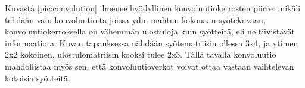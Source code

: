 \documentclass[finnish]{tktltiki2}
\theoremstyle{definition}
\theoremstyle{remark}
\begin{document}
    Kuvasta \ref{pic:convolution} ilmenee hyödyllinen konvoluutiokerrosten piirre: mikäli tehdään vain konvoluutioita joissa ydin mahtuu kokonaan syötekuvaan, konvoluutiokerroksella on vähemmän ulostuloja kuin syötteitä, eli ne tiivistävät informaatiota. Kuvan tapauksessa nähdään syötematriisin ollessa 3x4, ja ytimen 2x2 kokoinen, ulostulomatriisin kooksi tulee 2x3. Tällä tavalla konvoluutio mahdollistaa myös sen, että konvoluutioverkot voivat ottaa vastaan vaihtelevan kokoisia syötteitä.


    



\end{document}
